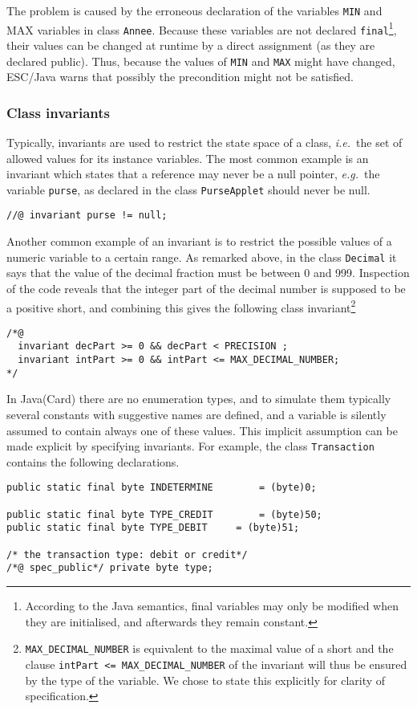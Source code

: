 \documentclass[a4paper]{llncs}
\begin{document}
The problem is caused by the erroneous declaration of the variables 
\texttt{MIN} and \textsc{MAX} variables in class \texttt{Annee}.
Because these variables are not declared 
\texttt{final}\footnote{According to the Java semantics, final
variables may only be modified when they are initialised, and
afterwards they remain constant.}, their values can be
changed at runtime by
a direct assignment (as they are declared public). Thus, because the
values of \texttt{MIN} and \texttt{MAX} might have changed, ESC/Java
warns that possibly the precondition might not be satisfied.








\subsubsection{Class invariants}
Typically, invariants are used to restrict the state space of a class,
\emph{i.e.}~the set of allowed values for its instance variables. The
most common example is an invariant which states that a reference may
never be a null pointer, \emph{e.g.}~the variable
\texttt{purse}, as declared in the class \texttt{PurseApplet}
should never be null.
\begin{verbatim}
//@ invariant purse != null;
\end{verbatim}
Another common example of an invariant is to restrict the possible
values of a numeric variable to a certain range. As remarked above, in
the class \texttt{Decimal} it says that the value of the decimal
fraction must be between 0 and 999. Inspection of the code reveals 
that the integer part of the decimal number is supposed to be a
positive short, and combining this gives the following class
invariant\footnote{\texttt{MAX\_DECIMAL\_NUMBER} is equivalent to the
maximal value of a short and the clause \texttt{intPart <=
MAX\_DECIMAL\_NUMBER} of the invariant will thus be
ensured by the type of the variable. We chose to state this explicitly
for clarity of specification.}
\begin{verbatim}
/*@
  invariant decPart >= 0 && decPart < PRECISION ;
  invariant intPart >= 0 && intPart <= MAX_DECIMAL_NUMBER;
*/
\end{verbatim}

In Java(Card) there are no enumeration types, and to simulate them
typically several constants with suggestive names are defined, and a
variable is silently assumed to contain always one of these
values. This implicit assumption can be made explicit by specifying
invariants. For example, the class \texttt{Transaction} contains the
following declarations.
\begin{verbatim}
public static final byte INDETERMINE		= (byte)0;

public static final byte TYPE_CREDIT		= (byte)50;
public static final byte TYPE_DEBIT		= (byte)51;
    
/* the transaction type: debit or credit*/
/*@ spec_public*/ private byte type;
\end{verbatim}
\end{document}
